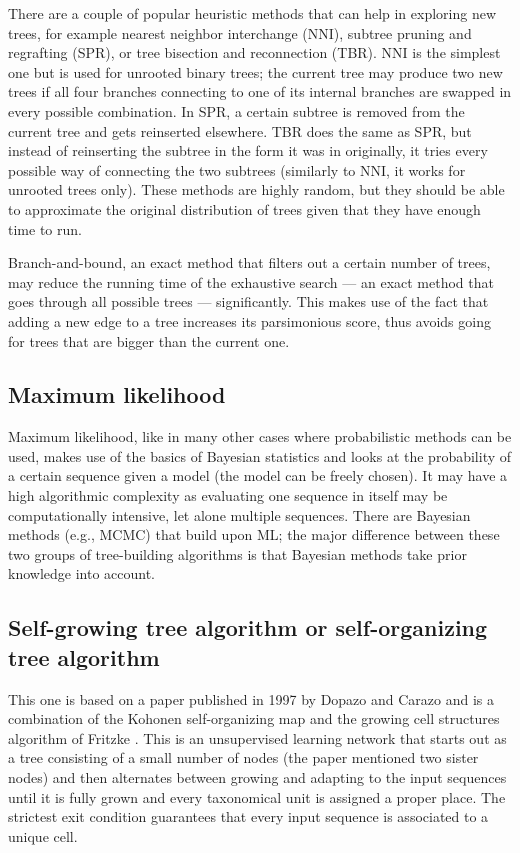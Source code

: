 \documentclass[11pt,twocolumn]{article}
\begin{document}
There are a couple of popular heuristic methods that can help in exploring new trees, for example nearest neighbor interchange (NNI), subtree pruning and regrafting (SPR), or tree bisection and reconnection (TBR). NNI is the simplest one but is used for unrooted binary trees; the current tree may produce two new trees if all four branches connecting to one of its internal branches are swapped in every possible combination. In SPR, a certain subtree is removed from the current tree and gets reinserted elsewhere. TBR does the same as SPR, but instead of reinserting the subtree in the form it was in originally, it tries every possible way of connecting the two subtrees (similarly to NNI, it works for unrooted trees only). These methods are highly random, but they should be able to approximate the original distribution of trees given that they have enough time to run.

Branch-and-bound, an exact method that filters out a certain number of trees, may reduce the running time of the exhaustive search — an exact method that goes through all possible trees — significantly. This makes use of the fact that adding a new edge to a tree increases its parsimonious score, thus avoids going for trees that are bigger than the current one.

\subsection*{Maximum likelihood}

Maximum likelihood, like in many other cases where probabilistic methods can be used, makes use of the basics of Bayesian statistics and looks at the probability of a certain sequence given a model (the model can be freely chosen). It may have a high algorithmic complexity as evaluating one sequence in itself may be computationally intensive, let alone multiple sequences. There are Bayesian methods (e.g., MCMC) that build upon ML; the major difference between these two groups of tree-building algorithms is that Bayesian methods take prior knowledge into account.

\subsection*{Self-growing tree algorithm or self-organizing tree algorithm}

This one is based on a paper published in 1997 by Dopazo and Carazo \cite{Dopazo1997} and is a combination of the Kohonen self-organizing map \cite{58325} and the growing cell structures algorithm of Fritzke \cite{Fritzke1994}. This is an unsupervised learning network that starts out as a tree consisting of a small number of nodes (the paper mentioned two sister nodes) and then alternates between growing and adapting to the input sequences until it is fully grown and every taxonomical unit is assigned a proper place. The strictest exit condition guarantees that every input sequence is associated to a unique cell.
\end{document}
